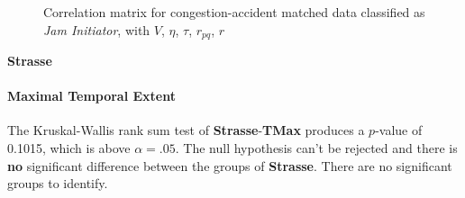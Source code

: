 \begin{figure}[!ht]
	\centering
	\caption{Correlation matrix for congestion-accident matched data classified as \textit{Jam Initiator}, with $V$, $\eta$, $\tau$, $r_{pq}$, $r$}
	\label{img:correlation_matrix_matched_cramers}
\end{figure}

\Large
\centerline{\textbf{Strasse}}
\normalsize

\paragraph{Maximal Temporal Extent}
The Kruskal-Wallis rank sum test of \textbf{Strasse}-\textbf{TMax} produces a $p$-value of 0.1015, which is above $\alpha=.05$. The null hypothesis can't be rejected and there is \textbf{no} significant difference between the groups of \textbf{Strasse}. There are no significant groups to identify.

